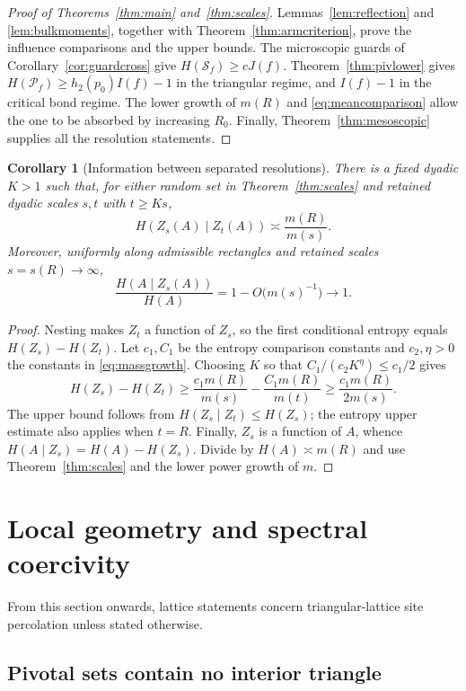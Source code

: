 \documentclass[11pt]{amsart}
\newtheorem{corollary}[theorem]{Corollary}
\theoremstyle{remark}
\newcommand{\cS}{\mathcal S}
\newcommand{\cP}{\mathcal P}
\begin{document}
\begin{proof}[Proof of Theorems~\ref{thm:main} and~\ref{thm:scales}]
Lemmas~\ref{lem:reflection} and \ref{lem:bulkmoments}, together with Theorem~\ref{thm:armcriterion}, prove the influence comparisons and the upper bounds. The microscopic guards of Corollary~\ref{cor:guardcross} give $H(\cS_f)\ge cJ(f)$. Theorem~\ref{thm:pivlower} gives $H(\cP_f)\ge h_2(p_0)I(f)-1$ in the triangular regime, and $I(f)-1$ in the critical bond regime. The lower growth of $m(R)$ and \eqref{eq:meancomparison} allow the one to be absorbed by increasing $R_0$. Finally, Theorem~\ref{thm:mesoscopic} supplies all the resolution statements.
\end{proof}

\begin{corollary}[Information between separated resolutions]\label{cor:resolution_information}
There is a fixed dyadic $K>1$ such that, for either random set in Theorem~\ref{thm:scales} and retained dyadic scales $s,t$ with $t\ge Ks$,
\[
 H(Z_s(A)\mid Z_t(A))\asymp\frac{m(R)}{m(s)}.
\]
Moreover, uniformly along admissible rectangles and retained scales $s=s(R)\to\infty$,
\[
 \frac{H(A\mid Z_s(A))}{H(A)}=1-O\bigl(m(s)^{-1}\bigr)\longrightarrow1.
\]
\end{corollary}
\begin{proof}
Nesting makes $Z_t$ a function of $Z_s$, so the first conditional entropy equals $H(Z_s)-H(Z_t)$. Let $c_1,C_1$ be the entropy comparison constants and $c_2,\eta>0$ the constants in \eqref{eq:massgrowth}. Choosing $K$ so that $C_1/(c_2K^\eta)\le c_1/2$ gives
\[
 H(Z_s)-H(Z_t)\ge\frac{c_1m(R)}{m(s)}-\frac{C_1m(R)}{m(t)}\ge\frac{c_1m(R)}{2m(s)}.
\]
The upper bound follows from $H(Z_s\mid Z_t)\le H(Z_s)$; the entropy upper estimate also applies when $t=R$. Finally, $Z_s$ is a function of $A$, whence $H(A\mid Z_s)=H(A)-H(Z_s)$. Divide by $H(A)\asymp m(R)$ and use Theorem~\ref{thm:scales} and the lower power growth of $m$.
\end{proof}

\section{Local geometry and spectral coercivity}\label{sec:localgeometry}

From this section onwards, lattice statements concern triangular-lattice site percolation unless stated otherwise.

\subsection{Pivotal sets contain no interior triangle}\label{sec:pivotal}
\end{document}
